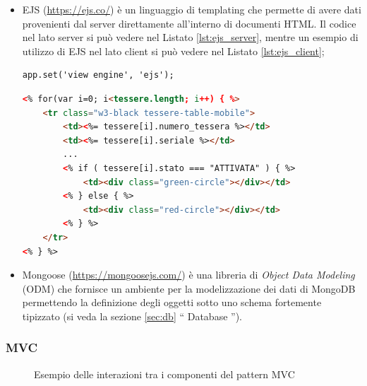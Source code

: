 \documentclass[12pt]{report}
\begin{document}
\begin{itemize}
	\item EJS (\url{https://ejs.co/}) è un linguaggio di templating che permette di avere dati provenienti dal server direttamente all'interno di documenti HTML. Il codice nel lato server si può vedere nel Listato \ref{lst:ejs_server}, mentre un esempio di utilizzo di EJS nel lato client si può vedere nel Listato \ref{lst:ejs_client};
\begin{lstlisting}[caption={Impostazione del \textquotedblleft{} view engine \textquotedblright{}}, label={lst:ejs_server}, xleftmargin=\dimexpr-\leftmargini]
app.set('view engine', 'ejs');
\end{lstlisting}
\begin{lstlisting}[language=HTML, morekeywords={if, else}, caption={Uso di \emph{EJS} nel lato client. Il codice JavaScript all'interno della pagina HTML è racchiuso tra \textquotedblleft{} $<$\% \%$>$ \textquotedblright{} e l'oggetto \textquotedblleft{} tessere \textquotedblright{} è stato passato dal server in formato JSON. Gli oggetti passati dal server sono racchiusi tra \textquotedblleft{} $<$\%= \%$>$ \textquotedblright{} }, label={lst:ejs_client}, xleftmargin=\dimexpr-\leftmargini]
<% for(var i=0; i<tessere.length; i++) { %>
	<tr class="w3-black tessere-table-mobile">
		<td><%= tessere[i].numero_tessera %></td>
		<td><%= tessere[i].seriale %></td>
		...
		<% if ( tessere[i].stato === "ATTIVATA" ) { %>
			<td><div class="green-circle"></div></td>
		<% } else { %>
			<td><div class="red-circle"></div></td>
		<% } %>
	</tr>
<% } %>
\end{lstlisting}

	\item Mongoose (\url{https://mongoosejs.com/}) è una libreria di \emph{Object Data Modeling} (ODM) che fornisce un ambiente per la modelizzazione dei dati di MongoDB permettendo la definizione degli oggetti sotto uno schema fortemente tipizzato (si veda la sezione \ref{sec:db} \textquotedblleft{} Database \textquotedblright{}).	
	
\end{itemize}

\subsubsection*{MVC}

\begin{figure}[H]
	\caption{Esempio delle interazioni tra i componenti del pattern MVC}
	\label{fig:mvc}
\end{figure}
\end{document}

